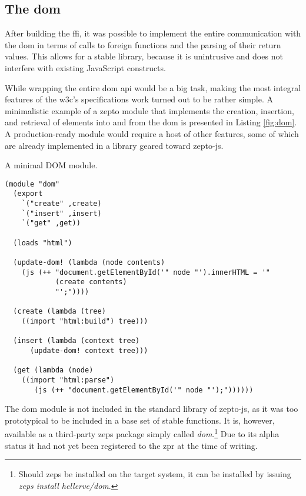 \documentclass[oneside,11pt,xetex]{scrbook}
\begin{document}
\subsection{The \gls{dom}}

After building the \gls{ffi}, it was possible to implement the entire
communication with the \gls{dom} in terms of calls to foreign functions
and the parsing of their return values. This allows for a stable library,
because it is unintrusive and does not interfere with existing JavaScript
constructs.

While wrapping the entire \gls{dom} \gls{api} would be a big task, making
the most integral features of the \gls{w3c}'s specifications work turned
out to be rather simple. A minimalistic example of a zepto module
that implements the creation, insertion, and retrieval of elements into
and from the \gls{dom} is presented in Listing \ref{fig:dom}. A production-ready
module would require a host of other features, some of which are already
implemented in a library geared toward zepto-js.

\begin{listing}[H]
\caption{A minimal DOM module.}
\begin{verbatim}
(module "dom"
  (export
    `("create" ,create)
    `("insert" ,insert)
    `("get" ,get))

  (loads "html")

  (update-dom! (lambda (node contents)
    (js (++ "document.getElementById('" node "').innerHTML = '"
            (create contents)
            "';"))))

  (create (lambda (tree)
    ((import "html:build") tree)))

  (insert (lambda (context tree)
      (update-dom! context tree)))

  (get (lambda (node)
    ((import "html:parse")
       (js (++ "document.getElementById('" node "');"))))))
\end{verbatim}
\label{fig:dom}
\end{listing}

The \gls{dom} module is not included in the standard library of zepto-js,
as it was too prototypical to be included in a base set of stable
functions. It is, however, available as a third-party \gls{zeps} package
simply called \textit{dom}.\footnote{Should \gls{zeps} be installed on
the target system, it can be installed by issuing \textit{zeps install
hellerve/dom}.} Due to its alpha status it had not yet been registered
to the \gls{zpr} at the time of writing.
\end{document}
